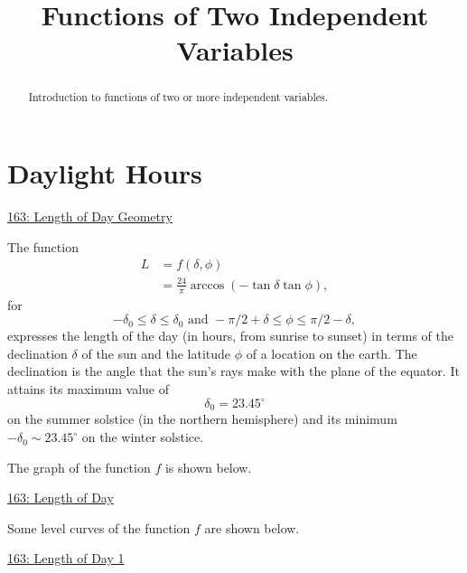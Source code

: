 \documentclass{ximera}
\title{Functions of Two Independent Variables}
\begin{document}
\begin{abstract}
Introduction to functions of two or more independent variables.
\end{abstract}
\maketitle


\section{Daylight Hours}


\begin{example} \label{Edft45346t34}
\begin{onlineOnly}
    \begin{center}
\end{center}
\end{onlineOnly}

\href{https://www.desmos.com/3d/jhuok4umw3}{163: Length of Day Geometry}



The function
\begin{align*}
      L &= f(\delta, \phi) \\
         & = \frac{24}{\pi}\arccos\left( -\tan \delta \tan \phi  \right) , 
\end{align*}
for
\[
             -\delta_0 \leq \delta \leq \delta_0 \text{ and } -\pi/2+\delta \leq \phi \leq \pi/2-\delta ,
\]
expresses the length of the day (in hours, from sunrise to sunset) in terms of the declination $\delta$ of the sun and the latitude $\phi$ of a location on the earth. The declination is the angle that the sun's rays make with the plane of the equator. It attains its maximum value of 
\[
   \delta_0 = 23.45^\circ
\]
on the summer solstice (in the northern hemisphere) and its minimum $-\delta_0 \sim 23.45^\circ$ on the winter solstice.

The graph of the function $f$ is shown below.

\begin{onlineOnly}
    \begin{center}
\end{center}
\end{onlineOnly}

\href{https://www.desmos.com/3d/kzyp9rm9i2}{163: Length of Day}


Some level curves of the function $f$ are shown below.

\begin{onlineOnly}
    \begin{center}
\end{center}
\end{onlineOnly}

\href{https://www.desmos.com/calculator/skdmdgnui1}{163: Length of Day 1}



\end{example}
\end{document}
